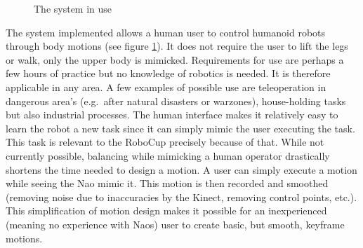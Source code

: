 \documentclass[11pt,a4paper,oneside]{article}
\begin{document}
\begin{figure}[htb]
\centering
{}
\caption{The system in use}
\label{fig:Duncan}
\end{figure}

The system implemented allows a human user to control humanoid robots through body motions (see figure \ref{fig:Duncan}). It does not require the user to lift the legs or walk, only the upper body is mimicked. Requirements for use are perhaps a few hours of practice but no knowledge of robotics is needed. It is therefore applicable in any area. A few examples of possible use are teleoperation in dangerous area’s (e.g.\ after natural disasters or warzones), house-holding tasks but also industrial processes. The human interface makes it relatively easy to learn the robot a new task since it can simply mimic the user executing the task. This task is relevant to the RoboCup precisely because of that. While not currently possible, balancing while mimicking a human operator drastically shortens the time needed to design a motion. A user can simply execute a motion while seeing the Nao mimic it. This motion is then recorded and smoothed (removing noise due to inaccuracies by the Kinect, removing control points, etc.). This simplification of motion design makes it possible for an inexperienced (meaning no experience with Naos) user to create basic, but smooth, keyframe motions.
\end{document}
